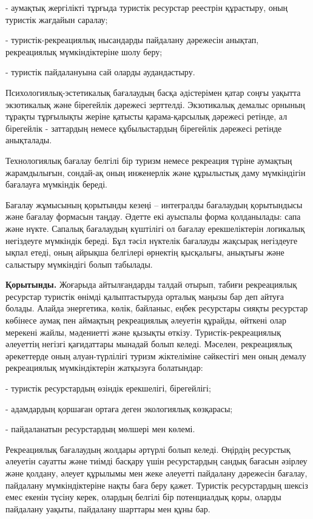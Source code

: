 \begin{multicols}{2}
- аумақтық жергілікті тұрғыда туристік ресурстар реестрін құрастыру,
оның туристік жағдайын саралау;

- туристік-рекреациялық нысандарды пайдалану дәрежесін анықтап,
рекреациялық мүмкіндіктеріне шолу беру;

- туристік пайдалануына сай оларды аудандастыру.

Психологиялық-эстетикалық бағалаудың басқа әдістерімен қатар соңғы
уақытта экзотикалық және бірегейлік дәрежесі зерттелді. Экзотикалық
демалыс орнының тұрақты тұрғылықты жеріне қатысты қарама-қарсылық
дәрежесі ретінде, ал бірегейлік - заттардың немесе құбылыстардың
бірегейлік дәрежесі ретінде анықталады.

Технологиялық бағалау белгілі бір туризм немесе рекреация түріне
аумақтың жарамдылығын, сондай-ақ оның инженерлік және құрылыстық даму
мүмкіндігін бағалауға мүмкіндік береді.

Бағалау жұмысының қорытынды кезеңі -- интегралды бағалаудың қорытындысы
және бағалау формасын таңдау. Әдетте екі ауыспалы форма қолданылады:
сапа және нүкте. Сапалық бағалаудың күштілігі ол бағалау ерекшеліктерін
логикалық негіздеуге мүмкіндік береді. Бұл тәсіл нүктелік бағалауды
жақсырақ негіздеуге ықпал етеді, оның айрықша белгілері өрнектің
қысқалығы, анықтығы және салыстыру мүмкіндігі болып табылады.

{\bfseries Қорытынды.} Жоғарыда айтылғандарды талдай отырып, табиғи
рекреациялық ресурстар туристік өнімді қалыптастыруда орталық маңызы бар
деп айтуға болады. Алайда энергетика, көлік, байланыс, еңбек ресурстары
сияқты ресурстар көбінесе аумақ пен аймақтың рекреациялық әлеуетін
құрайды, өйткені олар мерекені жайлы, мәдениетті және қызықты өткізу.
Туристік-рекреациялық әлеуеттің негізгі қағидаттары мынадай болып
келеді. Мәселен, рекреациялық әрекеттерде оның алуан-түрлілігі туризм
жіктеліміне сәйкестігі мен оның демалу рекреациялық мүмкіндіктерін
жатқызуға болатындар:

- туристік ресурстардың өзіндік ерекшелігі, бірегейлігі;

- адамдардың қоршаған ортаға деген экологиялық көзқарасы;

- пайдаланатын ресурстардың мөлшері мен көлемі.

Рекреациялық бағалаудың жолдары әртүрлі болып келеді. Өңірдің ресурстық
әлеуетін сауатты және тиімді басқару үшін ресурстардың сандық бағасын
әзірлеу және қолдану, әлеует құрылымы мен жеке әлеуетті пайдалану
дәрежесін бағалау, пайдалану мүмкіндіктеріне нақты баға беру қажет.
Туристік ресурстардың шексіз емес екенін түсіну керек, олардың белгілі
бір потенциалдық қоры, оларды пайдалану уақыты, пайдалану шарттары мен
құны бар.


\end{multicols}
